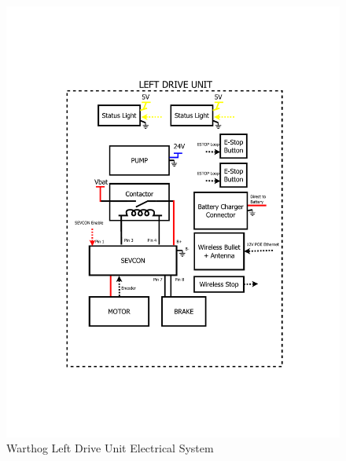 \documentclass[]{clearpath-latex/clearpath-manual}
\begin{document}
\begin{figure}[!htb]
  \centering
  \includegraphics[width=0.9\linewidth]{elec-left.pdf}
  \caption{Warthog Left Drive Unit Electrical System}
  \label{elec-left}
\end{figure}
\end{document}
